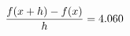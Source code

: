 \documentclass[preview]{standalone}
\begin{document}
\begin{align*}
\special{dvisvgm:raw <g id='unique000'>}\frac{f(x+h)-f(x)}{h} = 4.060\special{dvisvgm:raw </g>}
\end{align*}
\end{document}
